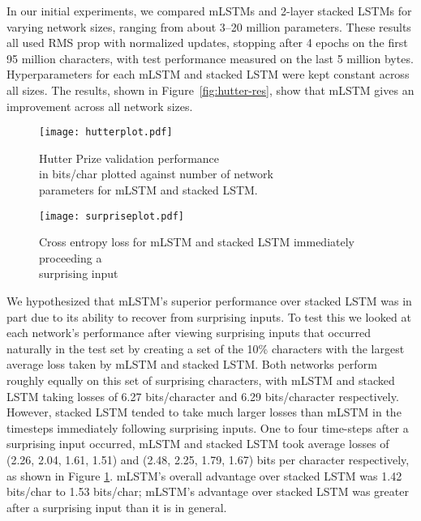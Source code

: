 \documentclass{article}
\begin{document}
In our initial experiments, we compared mLSTMs and 2-layer stacked LSTMs for varying network sizes, ranging from about 3--20 million parameters. These results all used RMS prop with normalized updates, stopping after 4 epochs on the first 95 million characters, with test performance measured on the last 5 million bytes. Hyperparameters for each mLSTM and stacked LSTM were kept constant across all sizes. The results, shown in Figure~\ref{fig:hutter-res}, show that mLSTM gives an improvement across all network sizes. 

\begin{figure}
  \begin{minipage}[b]{0.5\textwidth}
    \texttt{[image: hutterplot.pdf]}
    \caption{Hutter Prize validation performance \\ in bits/char plotted against number of network \\ parameters for mLSTM and stacked LSTM.}
    \label{fig:hutter-res}
  \end{minipage}
  \begin{minipage}[b]{0.5\textwidth}
    \texttt{[image: surpriseplot.pdf]}
    \caption{Cross entropy loss for mLSTM and stacked LSTM immediately proceeding a \\ surprising input}
    \label{fig:surprise-res}
  \end{minipage}
\end{figure}


We hypothesized that mLSTM's superior performance over stacked LSTM was in part due to its ability to recover from surprising inputs. To test this we looked at each network's performance after viewing surprising inputs that occurred naturally in the test set by creating a set of the 10\% characters with the largest average loss taken by mLSTM and stacked LSTM. Both networks perform roughly equally on this set of surprising characters, with mLSTM and stacked LSTM taking losses of 6.27 bits/character and 6.29 bits/character respectively. However, stacked LSTM tended to take much larger losses than mLSTM in the timesteps immediately following surprising inputs. One to four time-steps after a surprising input occurred, mLSTM and stacked LSTM took average losses of (2.26, 2.04, 1.61, 1.51) and (2.48, 2.25, 1.79, 1.67) bits per character respectively, as shown in Figure \ref{fig:surprise-res}. mLSTM's overall advantage over stacked LSTM was 1.42 bits/char to 1.53 bits/char; mLSTM's advantage over stacked LSTM was greater after a surprising input than it is in general. 
\end{document}
